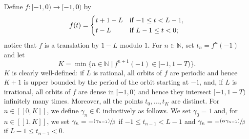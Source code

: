 \documentclass[10pt]{amsart}
\newcommand{\psfrac}[2]{\sfrac{(#1)}{#2}}
\newcommand{\llbracket}{[\![}
\newcommand{\rrbracket}{]\!]}
\theoremstyle{plain}
\theoremstyle{definition}
\newcommand{\suchthat}{\;|\:}
\begin{document}
Define $f: [-1, 0) \to [-1, 0)$ by
\[
f(t) = \begin{dcases*}
t + 1 - L& if $-1 \leq t < L - 1$,\\
t - L& if $L - 1 \leq t < 0$; 
\end{dcases*}
\]
notice that $f$ is a translation by $1 - L$ modulo $1$. For $n \in \mathbb N$, set $t_n = f^n(-1)$ and let
\[
K = \min\{n \in \mathbb N \suchthat f^{n+1}(-1) \in [-1, 1 - T)\}.
\]
$K$ is clearly well-defined: if $L$ is rational, all orbits of $f$ are periodic and hence $K+1$ is upper bounded by the period of the orbit starting at $-1$, and, if $L$ is irrational, all orbits of $f$ are dense in $[-1, 0)$ and hence they intersect $[-1, 1-T)$ infinitely many times. Moreover, all the points $t_0, \dots, t_K$ are distinct. For $n \in \llbracket 0, K\rrbracket$, we define $\gamma_n \in \mathbb C$ inductively as follows. We set $\gamma_0 = 1$ and, for $n \in \llbracket 1, K\rrbracket$, we set $\gamma_n = -\psfrac{\gamma_{n-1}}{\beta}$ if $-1 \leq t_{n-1} < L - 1$ and $\gamma_n = -\psfrac{\alpha \gamma_{n-1}}{\beta}$ if $L - 1 \leq t_{n-1} < 0$.
\end{document}
